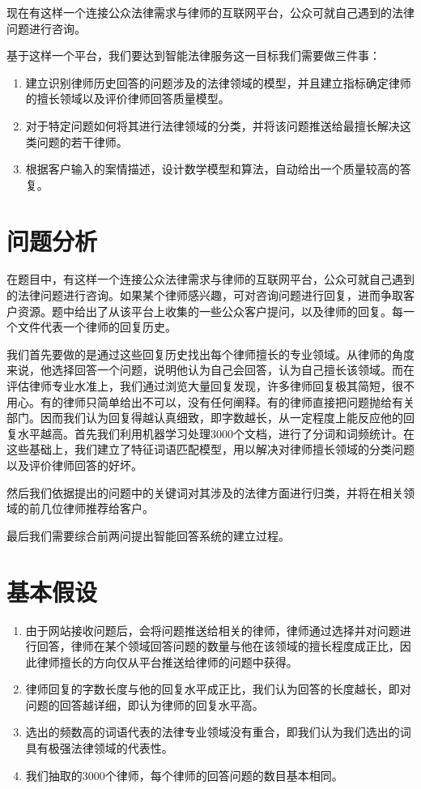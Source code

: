 \documentclass[bwprint]{cumcmthesis}
\begin{document}
现在有这样一个连接公众法律需求与律师的互联网平台，公众可就自己遇到的法律问题进行咨询。

基于这样一个平台，我们要达到智能法律服务这一目标我们需要做三件事：

\begin{enumerate}
	\item 建立识别律师历史回答的问题涉及的法律领域的模型，并且建立指标确定律师的擅长领域以及评价律师回答质量模型。
	\item 对于特定问题如何将其进行法律领域的分类，并将该问题推送给最擅长解决这类问题的若干律师。
	\item 根据客户输入的案情描述，设计数学模型和算法，自动给出一个质量较高的答复。
\end{enumerate}


\section{问题分析}

在题目中，有这样一个连接公众法律需求与律师的互联网平台，公众可就自己遇到的法律问题进行咨询。如果某个律师感兴趣，可对咨询问题进行回复，进而争取客户资源。题中给出了从该平台上收集的一些公众客户提问，以及律师的回复。每一个文件代表一个律师的回复历史。

我们首先要做的是通过这些回复历史找出每个律师擅长的专业领域。从律师的角度来说，他选择回答一个问题，说明他认为自己会回答，认为自己擅长该领域。而在评估律师专业水准上，我们通过浏览大量回复发现，许多律师回复极其简短，很不用心。有的律师只简单给出不可以，没有任何阐释。有的律师直接把问题抛给有关部门。因而我们认为回复得越认真细致，即字数越长，从一定程度上能反应他的回复水平越高。首先我们利用机器学习处理3000个文档，进行了分词和词频统计。在这些基础上，我们建立了特征词语匹配模型，用以解决对律师擅长领域的分类问题以及评价律师回答的好坏。

然后我们依据提出的问题中的关键词对其涉及的法律方面进行归类，并将在相关领域的前几位律师推荐给客户。

最后我们需要综合前两问提出智能回答系统的建立过程。

\section{基本假设}
\begin{enumerate}
	\item 由于网站接收问题后，会将问题推送给相关的律师，律师通过选择并对问题进行回答，律师在某个领域回答问题的数量与他在该领域的擅长程度成正比，因此律师擅长的方向仅从平台推送给律师的问题中获得。
	\item 律师回复的字数长度与他的回复水平成正比，我们认为回答的长度越长，即对问题的回答越详细，即认为律师的回复水平高。
	\item 选出的频数高的词语代表的法律专业领域没有重合，即我们认为我们选出的词具有极强法律领域的代表性。
	\item 我们抽取的3000个律师，每个律师的回答问题的数目基本相同。
\end{enumerate}
\end{document}
